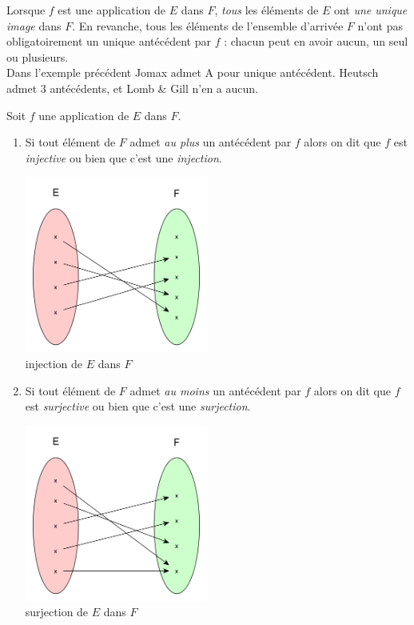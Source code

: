 \documentclass[a4paper,12pt,french]{book}
\begin{document}
\begin{remarque}[]
Lorsque $f$ est une application de $E$ dans $F$, \textit{tous} les éléments de $E$ ont \textit{une unique image} dans $F$. En revanche, tous les éléments de l'ensemble d'arrivée $F$ n'ont pas obligatoirement un unique antécédent par $f$ : chacun peut en avoir aucun, un seul ou plusieurs.\\
Dans l'exemple précédent Jomax admet A pour unique antécédent. Heutsch admet 3 antécédents, et Lomb \& Gill n'en a aucun.
\end{remarque}

\begin{definition}
Soit $f$ une application de $E$ dans $F$.
\begin{enumerate}[--]
	\item 	Si tout élément de $F$ admet \textit{au plus} un antécédent par $f$ alors on dit que $f$ est \textit{injective} ou bien que c'est une \textit{injection}.
	\begin{center}
	\includegraphics[width=6cm]{img/ex_inj.png}\\ {\footnotesize injection de $E$ dans $F$}
	\end{center}
	\item 	Si tout élément de $F$ admet \textit{au moins} un antécédent par $f$ alors on dit que $f$ est \textit{surjective} ou bien que c'est une \textit{surjection}.
		\begin{center}
		\includegraphics[width=6cm]{img/ex_surj.png}\\ {\footnotesize surjection de $E$ dans $F$}

\end{center}
\end{enumerate}
\end{definition}
\end{document}
